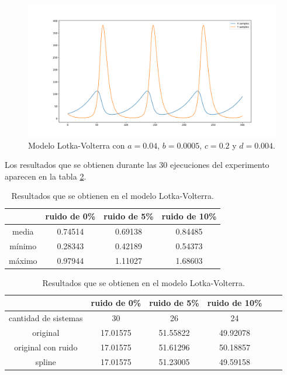 \begin{figure}[h]
    \centering
    \includegraphics[width=\textwidth]{"figures/lotka_volterra.pdf"}
    \caption{Modelo Lotka-Volterra con $a = 0.04$, $b = 0.0005$, $c = 0.2$ y $d = 0.004$.}
    \label{fig:lotka_volterra}
\end{figure}

Los resultados que se obtienen durante las 30 ejecuciones del experimento aparecen en la tabla \ref{table:experiment_lotka_volterra}.

\begin{table}[!h]
    \centering
    \caption{Resultados que se obtienen en el modelo Lotka-Volterra.}

    \begin{tabular}{|c|c|c|c|}
        \hline
               & \textbf{ruido de 0\%} & \textbf{ruido de 5\%} & \textbf{ruido de 10\%} \\
        \hline
        media  & 0.74514               & 0.69138               & 0.84485                \\
        \hline
        mínimo & 0.28343               & 0.42189               & 0.54373                \\
        \hline
        máximo & 0.97944               & 1.11027               & 1.68603                \\
        \hline
    \end{tabular}

    \begin{tabular}{|c|c|c|c|c|c|}
        \hline
                             & \textbf{ruido de 0\%} & \textbf{ruido de 5\%} & \textbf{ruido de 10\%} \\
        \hline
        cantidad de sistemas & 30                    & 26                    & 24                     \\
        \hline
        original             & 17.01575              & 51.55822              & 49.92078               \\
        \hline
        original con ruido   & 17.01575              & 51.61296              & 50.18857               \\
        \hline
        spline               & 17.01575              & 51.23005              & 49.59158               \\
        \hline
    \end{tabular}

    \label{table:experiment_lotka_volterra}
\end{table}

